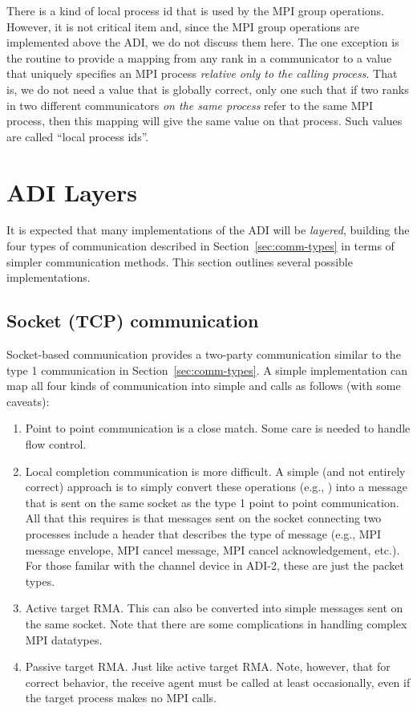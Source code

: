 There is a kind of local process id that is used by the MPI group
operations.  However, it is not critical item and, since the MPI group
operations are implemented above the ADI, we do not discuss them here.
The one exception is the routine to provide a mapping from any
rank in a communicator to a value that uniquely specifies an MPI
process \emph{relative only to the calling process}.  That is, we do
not need a value that is globally correct, only one such that if two
ranks in two different communicators \emph{on the same process} refer
to the same MPI process, then this mapping will give the same value on
that process.  Such values are called ``local process ids''.

\section{ADI Layers}
\label{sec:layers}

It is expected that many implementations of the ADI will be \emph{layered},
building the four types of communication described in
Section~\ref{sec:comm-types} in terms of simpler communication methods.
This section outlines several possible implementations.

\subsection{Socket (TCP) communication}
Socket-based communication provides a two-party communication similar
to the type 1 communication in Section~\ref{sec:comm-types}.  A simple
implementation can map all four kinds of communication into simple
 and  calls as follows (with some caveats):
\begin{enumerate}
\item Point to point communication is a close match.  Some care is
needed to handle flow control.

\item Local completion communication is more difficult.  A simple (and
not entirely correct) approach is to simply convert these operations
(e.g., ) into a message that is sent on the
same socket as the type 1 point to point communication.  All that this
requires is that messages sent on the socket connecting two processes
include a header that describes the type of message (e.g., MPI message
envelope, MPI cancel message, MPI cancel acknowledgement, etc.).  For
those familar with the channel device in ADI-2, these are just the
packet types.

\item Active target RMA.  This can also be converted into simple
messages sent on the same socket.  Note that there are some
complications in handling complex MPI datatypes.

\item Passive target RMA.  Just like active target RMA.  Note,
however, that for correct behavior, the receive agent must be called
at least occasionally, even if the target process makes no MPI calls.
\end{enumerate}

